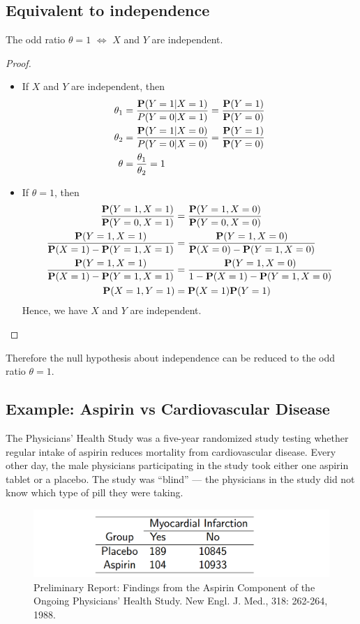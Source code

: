 \subsection{Equivalent to independence}
The odd ratio $\theta = 1$ $\iff$ $X$ and $Y$ are independent.
\begin{proof}
	\begin{itemize}
		\item If $X$ and $Y$ are independent, then
		\begin{align*}
			\theta_1 &= \frac{\P(Y = 1| X = 1)}{P(Y = 0| X = 1)} = \frac{\P(Y = 1)}{\P(Y = 0)}\\
			\theta_2 &= \frac{\P(Y = 1| X = 0)}{P(Y = 0| X = 0)} = \frac{\P(Y = 1)}{\P(Y = 0)}\\
			\theta &= \frac{\theta_1}{\theta_2} = 1
		\end{align*}
		\item If $\theta = 1$, then
		\begin{align*}
			\frac{\P(Y = 1, X = 1)}{\P(Y = 0, X = 1)} 
			&= \frac{\P(Y = 1, X = 0)}{\P(Y = 0, X = 0)} \\
			\frac{\P(Y = 1, X = 1)}{\P(X = 1) - \P(Y = 1, X = 1)} 
			&= \frac{\P(Y = 1, X = 0)}{\P(X = 0) - \P(Y = 1, X = 0)} \\
			\frac{\P(Y = 1, X = 1)}{\P(X = 1) - \P(Y = 1, X = 1)} 
			&= \frac{\P(Y = 1, X = 0)}{1 - \P(X = 1) - \P(Y = 1, X = 0)} \\
			\P(X = 1, Y = 1) &= \P(X = 1)\P(Y = 1)
		\end{align*}
	Hence, we have $X$ and $Y$ are independent.
	\end{itemize}
\end{proof}

Therefore the null hypothesis about independence can be reduced to the odd ratio $\theta = 1$.

\subsection{Example: Aspirin vs Cardiovascular Disease}

The Physicians' Health Study was a five-year randomized study
testing whether regular intake of aspirin reduces mortality from
cardiovascular disease. Every other day, the male physicians
participating in the study took either one aspirin tablet or a placebo.
The study was ``blind'' --- the physicians in the study did not know
which type of pill they were taking.

\begin{figure}[H]
	\centering
	\includegraphics[width=0.7\linewidth]{fig/screenshot003}
	\caption{Preliminary Report: Findings from the Aspirin Component of the Ongoing Physicians' Health Study. New Engl. J. Med., 318: 262-264, 1988.}
	\label{fig:screenshot003}
\end{figure}

